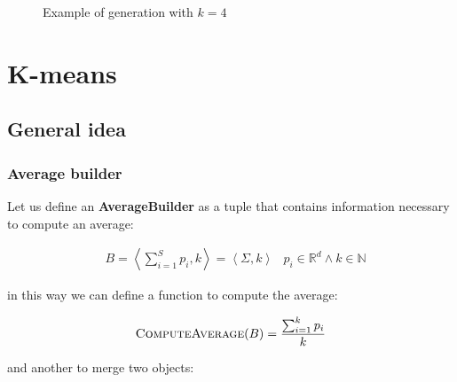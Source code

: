 \documentclass[parskip=full]{report}
\begin{document}
\begin{figure}[H]
	\centering
	\caption{Example of generation with $k=4$}
	\label{fig:cluster-example}
\end{figure}

\chapter{K-means}

\section{General idea}

\subsection{Average builder}
\label{avgBuild}

Let us define an \textbf{AverageBuilder} as a tuple that contains information 
necessary to compute an average:

\begin{align}
	\label{def:avgBuild}
& B = \left\langle \sum_{i = 1}^{S} p_i, k\right\rangle =
\left\langle \Sigma, k\right\rangle
&
p_i \in \mathbb{R}^d \land k \in \mathbb{N}
\end{align}

in this way we can define a function to compute the average:

\begin{equation}
\label{computeAvg}
\text{\textsc{ComputeAverage}}(B) = \dfrac{\sum_{i = 1}^{k} p_i}{k}
\end{equation}

and another to merge two objects:
\end{document}
